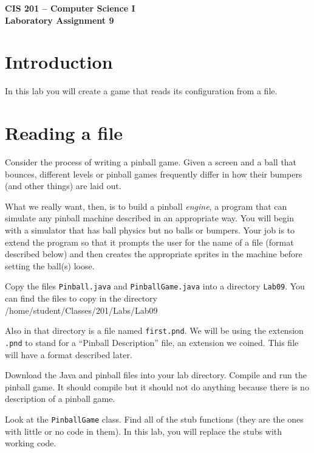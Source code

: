 \documentclass[12pt]{article}
\newenvironment{qv}%
  {\quote
   \verbatim}%
  {\endverbatim
   \endquote}
\newcommand{\code}{\texttt}
\newcommand{\fname}{\texttt}
\begin{document}
\sloppypar

\begin{center}
\Large\bf
CIS 201 -- Computer Science I\\
Laboratory Assignment 9\\
\end{center}

\section*{Introduction}
In this lab you will create a game that reads its configuration
from a file.

\section*{Reading a file}

Consider the process of writing a pinball game. Given a screen and a
ball that bounces, different levels or pinball games frequently differ
in how their bumpers (and other things) are laid out. 

What we really want, then, is to build a pinball \emph{engine}, a
program that can simulate any pinball machine described in an
appropriate way. You will begin with a simulator that has ball physics
but no balls or bumpers. Your job is to extend the program so that it prompts
the user for the name of a file (format described below) and
then creates the appropriate sprites in the machine before setting the
ball(s) loose.

Copy the files \fname{Pinball.java} and
\code{PinballGame.java} into a directory \fname{Lab09}.
You can find the files to copy in the directory
\begin{qv}
/home/student/Classes/201/Labs/Lab09
\end{qv}

Also in that directory is a file named \fname{first.pnd}.
We will be using the extension \fname{.pnd}
to stand for a ``Pinball Description'' file,
an extension we coined.
This file will have a format described later.

Download the Java and pinball files into your lab directory. Compile
and run the pinball game. It should compile but it should not do
anything because there is no description of a pinball game. 

Look at the \code{PinballGame} class. Find all of the
stub functions (they are the ones with little or no code in them).
In this lab, you will replace the stubs with working code.
\end{document}
